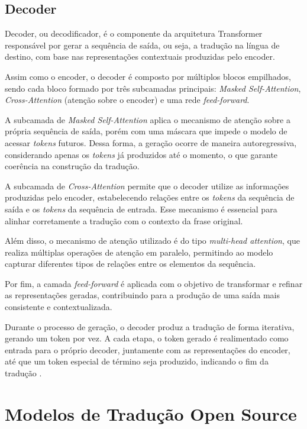 \subsection{Decoder}
Decoder, ou decodificador, é o componente da arquitetura Transformer
responsável por gerar a sequência de saída, ou seja, a tradução na língua de
destino, com base nas representações contextuais produzidas pelo encoder.

Assim como o encoder, o decoder é composto por múltiplos blocos empilhados,
sendo cada bloco formado por três subcamadas principais: \textit{Masked
    Self-Attention}, \textit{Cross-Attention} (atenção sobre o encoder) e uma rede
\textit{feed-forward}.

A subcamada de \textit{Masked Self-Attention} aplica o mecanismo de atenção
sobre a própria sequência de saída, porém com uma máscara que impede o modelo
de acessar \textit{tokens} futuros. Dessa forma, a geração ocorre de maneira
autoregressiva, considerando apenas os \textit{tokens} já produzidos até o momento, o
que garante coerência na construção da tradução.

A subcamada de \textit{Cross-Attention} permite que o decoder utilize as
informações produzidas pelo encoder, estabelecendo relações entre os \textit{tokens} da
sequência de saída e os \textit{tokens} da sequência de entrada. Esse mecanismo é
essencial para alinhar corretamente a tradução com o contexto da frase
original.

Além disso, o mecanismo de atenção utilizado é do tipo \textit{multi-head
    attention}, que realiza múltiplas operações de atenção em paralelo, permitindo
ao modelo capturar diferentes tipos de relações entre os elementos da
sequência.

Por fim, a camada \textit{feed-forward} é aplicada com o objetivo de
transformar e refinar as representações geradas, contribuindo para a produção
de uma saída mais consistente e contextualizada.

Durante o processo de geração, o decoder produz a tradução de forma iterativa,
gerando um token por vez. A cada etapa, o token gerado é realimentado como
entrada para o próprio decoder, juntamente com as representações do encoder,
até que um token especial de término seja produzido, indicando o fim da
tradução \cite{build-llms-from-scratch-book}.

\section{Modelos de Tradução Open Source}
